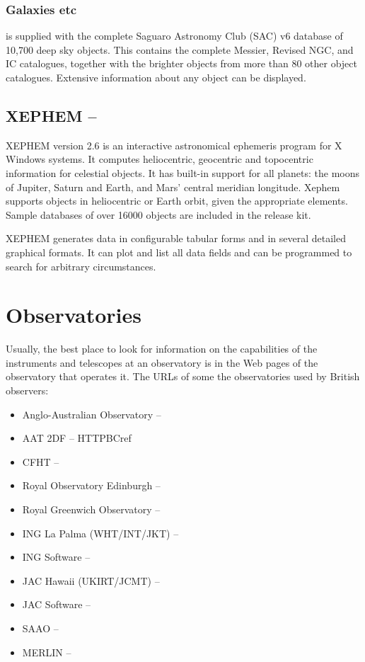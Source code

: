 \subsubsection{Galaxies etc}

{\SKYMAPPCref} is supplied with the complete Saguaro Astronomy Club (SAC) v6 database
of 10,700 deep sky objects. This contains the complete Messier, Revised NGC, and IC
catalogues, together with the brighter objects from more than 80 other object
catalogues. Extensive information about any object can be displayed. 
 
\subsection{XEPHEM -- {\IRAFref}}   
\label{sec:xephem}

XEPHEM version 2.6 is an interactive astronomical ephemeris program for X
Windows systems. It computes heliocentric, geocentric and topocentric
information for celestial objects. It has built-in support for all
planets: the moons of Jupiter, Saturn and Earth, and Mars' central meridian
longitude. Xephem supports objects in heliocentric or Earth orbit, given the
appropriate elements. Sample databases of over 16000 objects are included in
the release kit. 

XEPHEM generates data in configurable tabular forms and in several detailed
graphical formats. It can plot and list all data fields and can be
programmed to search for arbitrary circumstances.


\section{Observatories} 
\label{sec:observatories}
 

Usually, the best place to look for information on the capabilities of the
instruments and telescopes at an observatory is in the Web pages of
the observatory that operates it. The URLs of some the observatories 
used by British observers:

\begin{itemize}
\item Anglo-Australian Observatory -- {\HTTPGref}
\item AAT 2DF -- {HTTPBCref}
\item CFHT -- {\HTTPBZref}
\item Royal Observatory Edinburgh -- {\HTTPHref}                                         
\item Royal Greenwich Observatory -- {\HTTPIref} 
\item ING La Palma (WHT/INT/JKT) -- {\HTTPJref} 
\item ING Software -- {\HTTPJref}
\item JAC Hawaii (UKIRT/JCMT) -- {\HTTPKref} 
\item JAC Software -- {\HTTPLref}
\item SAAO -- {\HTTPBAref}
\item MERLIN -- {\HTTPBBref}
\end {itemize}

